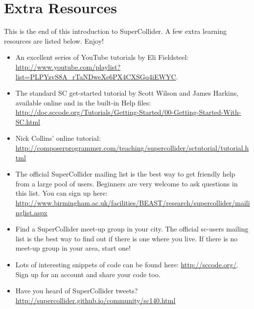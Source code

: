 \section{Extra Resources}

This is the end of this introduction to SuperCollider. A few extra learning resources are listed below. Enjoy!

\begin{itemize}
\item An excellent series of YouTube tutorials by Eli Fieldsteel: \url{http://www.youtube.com/playlist?list=PLPYzvS8A_rTaNDweXe6PX4CXSGq4iEWYC}. 

\item The standard SC get-started tutorial by Scott Wilson and James Harkins, available online and in the built-in Help files: \url{http://doc.sccode.org/Tutorials/Getting-Started/00-Getting-Started-With-SC.html}

\item Nick Collins' online tutorial: \url{http://composerprogrammer.com/teaching/supercollider/sctutorial/tutorial.html}
 
\item The official SuperCollider mailing list is the best way to get friendly help from a large pool of users. Beginners are very welcome to ask questions in this list. You can sign up here: \url{http://www.birmingham.ac.uk/facilities/BEAST/research/supercollider/mailinglist.aspx}

\item Find a SuperCollider meet-up group in your city. The official sc-users mailing list is the best way to find out if there is one where you live. If there is no meet-up group in your area, start one!

\item Lots of interesting snippets of code can be found here: \url{http://sccode.org/}. Sign up for an account and share your code too.

\item Have you heard of SuperCollider tweets? \url{http://supercollider.github.io/community/sc140.html}

\end{itemize}
